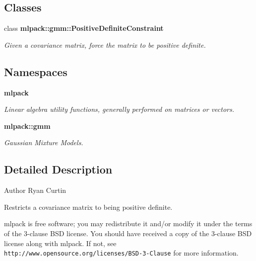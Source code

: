 \subsection*{Classes}
\begin{DoxyCompactItemize}
\item 
class {\bf mlpack\+::gmm\+::\+Positive\+Definite\+Constraint}
\begin{DoxyCompactList}\small\item\em Given a covariance matrix, force the matrix to be positive definite. \end{DoxyCompactList}\end{DoxyCompactItemize}
\subsection*{Namespaces}
\begin{DoxyCompactItemize}
\item 
 {\bf mlpack}
\begin{DoxyCompactList}\small\item\em Linear algebra utility functions, generally performed on matrices or vectors. \end{DoxyCompactList}\item 
 {\bf mlpack\+::gmm}
\begin{DoxyCompactList}\small\item\em Gaussian Mixture Models. \end{DoxyCompactList}\end{DoxyCompactItemize}


\subsection{Detailed Description}
\begin{DoxyAuthor}{Author}
Ryan Curtin
\end{DoxyAuthor}
Restricts a covariance matrix to being positive definite.

mlpack is free software; you may redistribute it and/or modify it under the terms of the 3-\/clause B\+SD license. You should have received a copy of the 3-\/clause B\+SD license along with mlpack. If not, see {\tt http\+://www.\+opensource.\+org/licenses/\+B\+S\+D-\/3-\/\+Clause} for more information. 